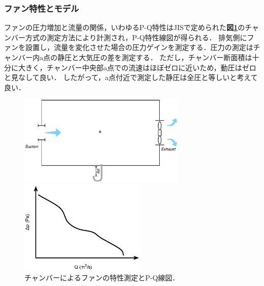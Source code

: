 %
\subsubsection{ファン特性とモデル}
ファンの圧力増加と流量の関係，いわゆるP-Q特性はJISで定められた\textbf{図\ref{fig:chamber&p-q}}のチャンバー方式の測定方法により計測され，P-Q特性線図が得られる．
排気側にファンを設置し，流量を変化させた場合の圧力ゲインを測定する．圧力の測定はチャンバー内a点の静圧と大気圧の差を測定する．
ただし，チャンバー断面積は十分に大きく，チャンバー中央部a点での流速はほぼゼロに近いため，動圧はゼロと見なして良い．
したがって，a点付近で測定した静圧は全圧と等しいと考えて良い．

\begin{figure}[htdp]
\begin{minipage}{0.5\hsize}
\begin{center}
\includegraphics[width=8cm,clip]{chamber.eps}
\end{center}
\end{minipage}
\begin{minipage}{0.45\hsize}
\begin{center}
\includegraphics[width=6cm,clip]{fan-PQ.eps}
\end{center}
\end{minipage}
\caption{チャンバーによるファンの特性測定とP-Q線図．}
\label{fig:chamber&p-q}
\end{figure}

